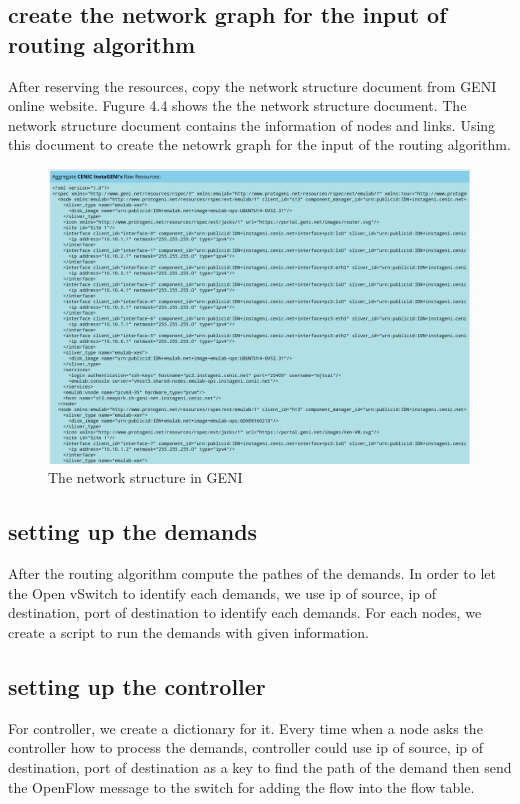 \documentclass[a4paper,12pt]{report}
\begin{document}
\begin{large}
	     \subsection{create the network graph for the input of routing algorithm}
	     \qquad After reserving the resources, copy the network structure document from GENI online website. Fugure 4.4 shows the the network structure document. The network structure document contains the information of nodes and links. Using this document to create the netowrk graph for the input of the routing algorithm.
	     \begin{figure}
	        \caption{The network structure in GENI}
	        \centering
	          \includegraphics[width=1.0\textwidth]{Raw_resource.png}
	     \end{figure}
	     \subsection{setting up the demands}
	     \qquad After the routing algorithm compute the pathes of the demands. In order to let the Open vSwitch to identify each demands, we use ip of source, ip of destination, port of destination to identify each demands.
	 For each nodes, we create a script to run the demands with given information. 
	 	\subsection{setting up the controller}
	 	\qquad For controller, we create a dictionary for it. Every time when a node asks the controller how to process the demands, controller could use ip of source, ip of destination, port of destination as a key to find the path of the demand then send the OpenFlow message to the switch for adding the flow into the flow table. 

\end{large}
\end{document}
